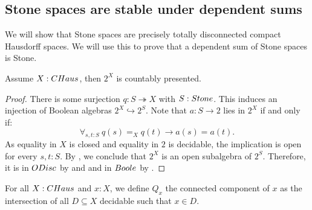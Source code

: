 \subsection{Stone spaces are stable under dependent sums}
We will show that Stone spaces are precisely totally disconnected compact Hausdorff spaces. 
We will use this to prove that a dependent sum of Stone spaces is Stone.

\begin{lemma}\label{AlgebraCompactHausdorffCountablyPresented}
Assume $X:\Chaus$, then $2^X$ is countably presented.
\end{lemma}

\begin{proof}
  There is some surjection $q:S\twoheadrightarrow X$ with $S:\Stone$. 
%
  This induces an injection of Boolean algebras $2^X \hookrightarrow 2^S$.
  Note that $a:S\to 2$ lies in $2^X$ if and only if: %
  $$\forall_{s,t:S}\ q(s) =_X q(t) \to a(s)=a(t).$$
  As equality in $X$ is closed and equality in $2$ is decidable, the implication is open for every $s,t:S$. 
  By , we conclude that
  $2^X$ is an open subalgebra of $2^S$. 
  Therefore, it is in $\ODisc$ by
   and  
  and in $\Boole$ by .
%
%
%
\end{proof}
\begin{definition}
For all $X:\Chaus$ and $x:X$,
  we define $Q_x$ the connected component of $x$
  as the intersection of all $D\subseteq X$ decidable such that $x\in D$. 
\end{definition}


